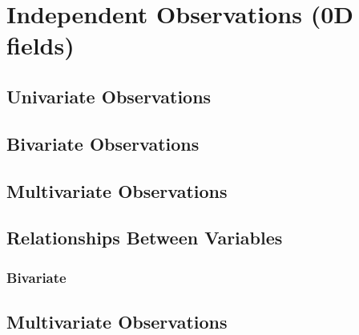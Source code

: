 \documentclass[../main.tex]{subfiles}
\begin{document}
\section{Independent Observations (0D fields)}


\subsection{Univariate Observations}


\subsection{Bivariate Observations}

\subsection{Multivariate Observations}

\subsection{Relationships Between Variables}
\subsubsection{Bivariate}

\subsection{Multivariate Observations}

\end{document}
